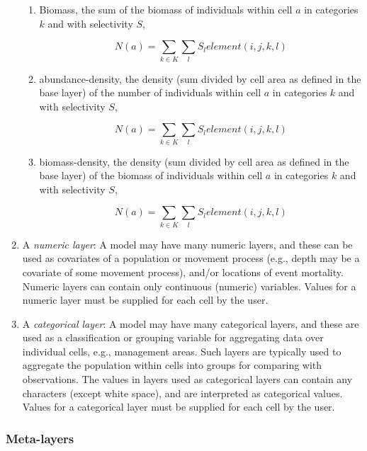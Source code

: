 \begin{enumerate}
\begin{enumerate}
\item Biomass, the sum of the biomass of individuals within cell $a$ in categories $k$ and with selectivity $S$,

\[
N\left( a \right) = \sum\limits_{k \in K} {\sum\limits_l {S_l element\left( {i,j,k,l} \right)} } 
\]

\item abundance-density, the density (sum divided by cell area as defined in the base layer) of the number of individuals within cell $a$ in categories $k$ and with selectivity $S$,

\[
N\left( a \right) = \sum\limits_{k \in K} {\sum\limits_l {S_l element\left( {i,j,k,l} \right)} } 
\]

\item biomass-density, the density (sum divided by cell area as defined in the base layer) of the biomass of individuals within cell $a$ in categories $k$ and with selectivity $S$,

\[
N\left( a \right) = \sum\limits_{k \in K} {\sum\limits_l {S_l element\left( {i,j,k,l} \right)} } 
\]

\end{enumerate}

\item A \emph{numeric layer}: A model may have many numeric layers, and these can be used as covariates of a population or movement process (e.g., depth may be a covariate of some movement process), and/or locations of event mortality. Numeric layers can contain only continuous (numeric) variables. Values for a numeric layer must be supplied for each cell by the user.

\item A \emph{categorical layer}: A model may have many categorical layers, and these are used as a classification or grouping variable for aggregating data over individual cells, e.g., management areas. Such layers are typically used to aggregate the population within cells into groups for comparing with observations. The values in layers used as categorical layers can contain any characters (except white space), and are interpreted as categorical values. Values for a categorical layer must be supplied for each cell by the user.

\end{enumerate}

\subsubsection{Meta-layers\label{meta-layers}}

